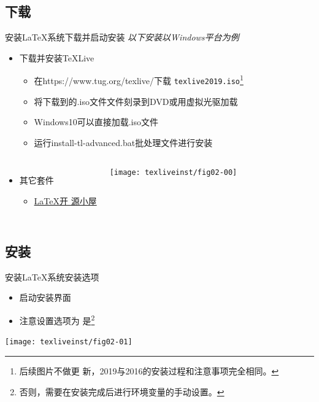 \documentclass[fontset = adobe, xcolor=svgnames, t, aspectratio=169]{ctexbeamer}
\begin{document}
\subsection[下载]{下载}
\begin{frame}[t]{安装\LaTeX 系统}{下载并启动安装}
  \stretchon
  \emph{以下安装以Windows平台为例}
  \begin{itemize}
  \item 下载并安装\TeX Live
    \begin{itemize}
    \item 在\url{}{https://www.tug.org/texlive/}下载
      \texttt{texlive2019.iso}\footnote[frame]{后续图片不做更
        新，2019与2016的安装过程和注意事项完全相同。}
    \item 将下载到的.iso文件文件刻录到DVD或用虚拟光驱加载
    \item Windows10可以\alert{直接加载}.iso文件
    \item 运行install-tl-advanced.bat批处理文件进行安装
    \end{itemize}
  \end{itemize}
  \vspace{-3ex}
  \begin{columns}[T]
  \begin{itemize}  
  \item 其它套件
    \begin{itemize}
    \item \href{http://www.latexstudio.net/page/texsoftware}{\LaTeX 开
        源小屋}
    \end{itemize}
  \end{itemize}
  \centering%
  \texttt{[image: texliveinst/fig02-00]}
  \end{columns}
  \stretchoff
\end{frame}
\subsection[安装]{安装}
\begin{frame}[t]{安装\LaTeX 系统}{安装选项}
  \begin{itemize}
  \item 启动安装界面
  \item 注意设置选项为
    \alert{是}\footnote[frame]{否则，需要在安装完成后进行环境变量的手动设置。}
  \end{itemize}
  \centering
  \begin{annotatedFigure}
    {\texttt{[image: texliveinst/fig02-01]}}
  \end{annotatedFigure}  
\end{frame}
\end{document}
